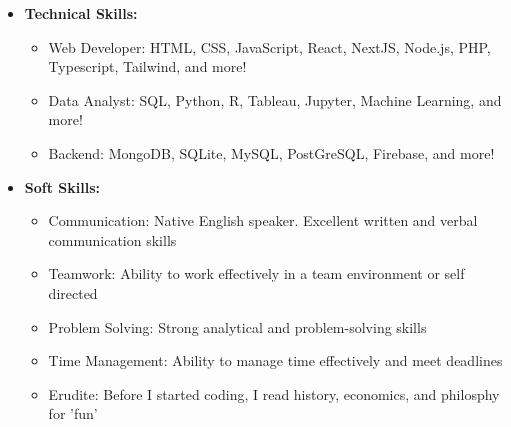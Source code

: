 
\begin{itemize}
  \item \textbf{Technical Skills:}
  \begin{itemize}
    \item Web Developer: HTML, CSS, JavaScript, React, NextJS, Node.js, PHP, Typescript, Tailwind, and more!
    \item Data Analyst: SQL, Python, R, Tableau, Jupyter, Machine Learning, and more!
    \item Backend: MongoDB, SQLite, MySQL, PostGreSQL, Firebase, and more!
  \end{itemize}
  \item \textbf{Soft Skills:}
    \begin{itemize}
      \item Communication: Native English speaker. Excellent written and verbal communication skills
      \item Teamwork: Ability to work effectively in a team environment or self directed
      \item Problem Solving: Strong analytical and problem-solving skills
      \item Time Management: Ability to manage time effectively and meet deadlines
      \item Erudite: Before I started coding, I read history, economics, and philosphy for 'fun'
    \end{itemize}
\end{itemize}